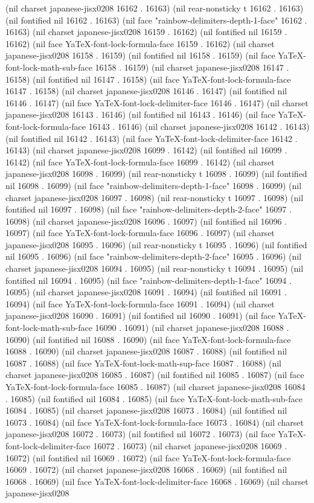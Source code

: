 (nil charset japanese-jisx0208 16162 . 16163) (nil rear-nonsticky t 16162 . 16163) (nil fontified nil 16162 . 16163) (nil face "rainbow-delimiters-depth-1-face" 16162 . 16163) (nil charset japanese-jisx0208 16159 . 16162) (nil fontified nil 16159 . 16162) (nil face YaTeX-font-lock-formula-face 16159 . 16162) (nil charset japanese-jisx0208 16158 . 16159) (nil fontified nil 16158 . 16159) (nil face YaTeX-font-lock-math-sub-face 16158 . 16159) (nil charset japanese-jisx0208 16147 . 16158) (nil fontified nil 16147 . 16158) (nil face YaTeX-font-lock-formula-face 16147 . 16158) (nil charset japanese-jisx0208 16146 . 16147) (nil fontified nil 16146 . 16147) (nil face YaTeX-font-lock-delimiter-face 16146 . 16147) (nil charset japanese-jisx0208 16143 . 16146) (nil fontified nil 16143 . 16146) (nil face YaTeX-font-lock-formula-face 16143 . 16146) (nil charset japanese-jisx0208 16142 . 16143) (nil fontified nil 16142 . 16143) (nil face YaTeX-font-lock-delimiter-face 16142 . 16143) (nil charset japanese-jisx0208 16099 . 16142) (nil fontified nil 16099 . 16142) (nil face YaTeX-font-lock-formula-face 16099 . 16142) (nil charset japanese-jisx0208 16098 . 16099) (nil rear-nonsticky t 16098 . 16099) (nil fontified nil 16098 . 16099) (nil face "rainbow-delimiters-depth-1-face" 16098 . 16099) (nil charset japanese-jisx0208 16097 . 16098) (nil rear-nonsticky t 16097 . 16098) (nil fontified nil 16097 . 16098) (nil face "rainbow-delimiters-depth-2-face" 16097 . 16098) (nil charset japanese-jisx0208 16096 . 16097) (nil fontified nil 16096 . 16097) (nil face YaTeX-font-lock-formula-face 16096 . 16097) (nil charset japanese-jisx0208 16095 . 16096) (nil rear-nonsticky t 16095 . 16096) (nil fontified nil 16095 . 16096) (nil face "rainbow-delimiters-depth-2-face" 16095 . 16096) (nil charset japanese-jisx0208 16094 . 16095) (nil rear-nonsticky t 16094 . 16095) (nil fontified nil 16094 . 16095) (nil face "rainbow-delimiters-depth-1-face" 16094 . 16095) (nil charset japanese-jisx0208 16091 . 16094) (nil fontified nil 16091 . 16094) (nil face YaTeX-font-lock-formula-face 16091 . 16094) (nil charset japanese-jisx0208 16090 . 16091) (nil fontified nil 16090 . 16091) (nil face YaTeX-font-lock-math-sub-face 16090 . 16091) (nil charset japanese-jisx0208 16088 . 16090) (nil fontified nil 16088 . 16090) (nil face YaTeX-font-lock-formula-face 16088 . 16090) (nil charset japanese-jisx0208 16087 . 16088) (nil fontified nil 16087 . 16088) (nil face YaTeX-font-lock-math-sup-face 16087 . 16088) (nil charset japanese-jisx0208 16085 . 16087) (nil fontified nil 16085 . 16087) (nil face YaTeX-font-lock-formula-face 16085 . 16087) (nil charset japanese-jisx0208 16084 . 16085) (nil fontified nil 16084 . 16085) (nil face YaTeX-font-lock-math-sub-face 16084 . 16085) (nil charset japanese-jisx0208 16073 . 16084) (nil fontified nil 16073 . 16084) (nil face YaTeX-font-lock-formula-face 16073 . 16084) (nil charset japanese-jisx0208 16072 . 16073) (nil fontified nil 16072 . 16073) (nil face YaTeX-font-lock-delimiter-face 16072 . 16073) (nil charset japanese-jisx0208 16069 . 16072) (nil fontified nil 16069 . 16072) (nil face YaTeX-font-lock-formula-face 16069 . 16072) (nil charset japanese-jisx0208 16068 . 16069) (nil fontified nil 16068 . 16069) (nil face YaTeX-font-lock-delimiter-face 16068 . 16069) (nil charset japanese-jisx0208 